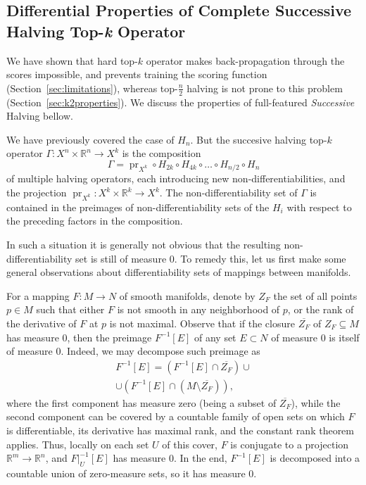 \documentclass{article}
\newcommand{\RR}{\mathbb{R}}
\begin{document}
\subsection{Differential Properties of Complete Successive Halving Top-\textit{k} Operator}\label{appendix_math}

We have shown that hard top-$k$ operator makes back-propagation through the scores impossible, and prevents training the scoring function (Section~\ref{sec:limitations}), whereas top-$\tfrac{n}{2}$ halving is not prone to this problem (Section~\ref{sec:k2properties}). We discuss the properties of full-featured \emph{Successive} Halving bellow.

We have previously covered the case of \(H_{n}\). But the succesive halving top-\(k\) operator \(\Gamma\colon X^{n}\times\RR^{n} \to X^{k}\) is the composition 
\begin{equation}
\label{eq:composition}
    \Gamma = \operatorname{pr}_{X^{k}} \circ H_{2k}\circ H_{4k} \circ\dots\circ H_{n/2} \circ H_{n}
\end{equation}
of multiple halving operators, each introducing new non-differentiabilities, and the projection \(\operatorname{pr}_{X^{k}}\colon X^{k}\times\RR^{k}\to X^{k}\). The non-differentiability set of \(\Gamma\) is contained in the preimages of non-differentiability sets of the \(H_{i}\) with respect to the preceding factors in the composition.

In such a situation it is generally not obvious that the resulting non-differentiability set is still of measure \(0\). To remedy this, let us first make some general observations about differentiability sets of mappings between manifolds. 

For a mapping $F\colon M\to N$ of smooth manifolds, denote by $Z_F$ the set of all points $p\in M$ such that either $F$ is not smooth in any neighborhood of $p$, or the rank of the derivative of $F$ at $p$ is not maximal. Observe that if the closure $\overline{Z_F}$ of $Z_F \subseteq M$ has measure $0$, then the preimage $F^{-1}[E]$ of any set $E\subset N$ of measure $0$ is itself of measure $0$. Indeed, we may decompose such preimage as
\begin{multline}
    F^{-1}[E] = (F^{-1}[E] \cap \overline{Z_F}) \cup\\\cup (F^{-1}[E] \cap (M\setminus\overline{Z_F})),
\end{multline}
where the first component has measure zero (being a subset of $\overline{Z_F}$), while the second component can be covered by a countable family of open sets on which $F$ is differentiable, its derivative has maximal rank, and the constant rank theorem applies. Thus, locally on each set $U$ of this cover, $F$ is conjugate to a projection $\RR^m \to \RR^n$, and $F|_U^{-1}[E]$ has measure 0. In the end, $F^{-1}[E]$ is decomposed into a countable union of zero-measure sets, so it has measure $0$.
\end{document}
